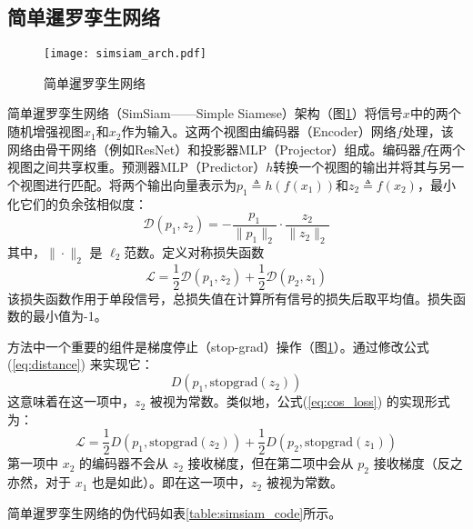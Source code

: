 \documentclass[master]{thesis-uestc}
\begin{document}
\subsection{简单暹罗孪生网络}
\begin{figure}[h]
    \texttt{[image: simsiam\_arch.pdf]}
    \caption{简单暹罗孪生网络}
    \label{simsiam_arch}
\end{figure}
简单暹罗孪生网络（SimSiam——Simple Siamese）架构（图\ref{simsiam_arch}）将信号$x$中的两个随机增强视图$x_1$和$x_2$作为输入。这两个视图由编码器（Encoder）网络$f$处理，该网络由骨干网络（例如ResNet）和投影器MLP（Projector）组成。编码器$f$在两个视图之间共享权重。预测器MLP（Predictor）$h$转换一个视图的输出并将其与另一个视图进行匹配。将两个输出向量表示为$p_1 \triangleq h(f(x_1))$和$z_2 \triangleq f(x_2)$，最小化它们的负余弦相似度：
\begin{equation}
    \mathcal{D}(p_1, z_2) = -\frac{p_1}{\|p_1\|_2} \cdot \frac{z_2}{\|z_2\|_2}
    \label{eq:distance}
\end{equation}  
其中，$\|\cdot\|_2$ 是 $\ell_2$范数。定义对称损失函数
\begin{equation}
    \mathcal{L} = \frac{1}{2} \mathcal{D}(p_{1}, z_{2}) + \frac{1}{2} \mathcal{D}(p_{2}, z_{1})
\label{eq:cos_loss}
\end{equation}
该损失函数作用于单段信号，总损失值在计算所有信号的损失后取平均值。损失函数的最小值为-1。

方法中一个重要的组件是梯度停止（stop-grad）操作（图\ref{simsiam_arch}）。通过修改公式(\ref{eq:distance}) 来实现它：
\begin{equation}
    D(p_1, \text{stopgrad}(z_2))
\label{eq:stopgrad}
\end{equation}
这意味着在这一项中，\( z_2 \) 被视为常数。类似地，公式(\ref{eq:cos_loss}) 的实现形式为：
\begin{equation}
\mathcal{L} = \frac{1}{2} D(p_1, \text{stopgrad}(z_2)) + \frac{1}{2} D(p_2, \text{stopgrad}(z_1))
\label{eq:cos_loss_stopgrad}
\end{equation}
第一项中 \( x_2 \) 的编码器不会从 \( z_2 \) 接收梯度，但在第二项中会从 \( p_2 \) 接收梯度（反之亦然，对于 \( x_1 \) 也是如此）。即在这一项中，\( z_2 \) 被视为常数。

简单暹罗孪生网络的伪代码如表\ref{table:simsiam_code}所示。
\end{document}
